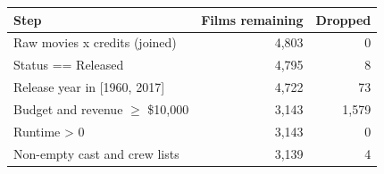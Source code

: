 \begin{tabular}{lrr}
\toprule
Step & Films remaining & Dropped \\
\midrule
Raw movies x credits (joined) & 4,803 & 0 \\
Status == Released & 4,795 & 8 \\
Release year in [1960, 2017] & 4,722 & 73 \\
Budget and revenue $\geq$ \$10,000 & 3,143 & 1,579 \\
Runtime > 0 & 3,143 & 0 \\
Non-empty cast and crew lists & 3,139 & 4 \\
\bottomrule
\end{tabular}